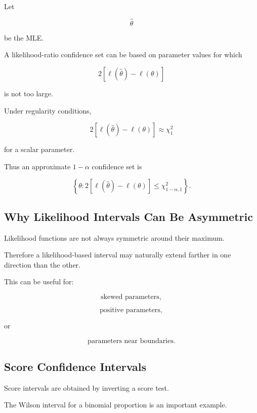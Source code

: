 Let

\[
\widehat{\theta}
\]

be the MLE.

A likelihood-ratio confidence set can be based on parameter values for
which

\[
\boxed{
2
\left[
\ell(\widehat{\theta})
-
\ell(\theta)
\right]
}
\]

is not too large.

Under regularity conditions,

\[
\boxed{
2
\left[
\ell(\widehat{\theta})
-
\ell(\theta)
\right]
\approx
\chi^2_1
}
\]

for a scalar parameter.

Thus an approximate \(1-\alpha\) confidence set is

\[
\boxed{
\left\{
\theta:
2
[
\ell(\widehat{\theta})
-
\ell(\theta)
]
\leq
\chi^2_{1-\alpha,1}
\right\}.
}
\]

\subsection{Why Likelihood Intervals Can Be Asymmetric}
\label{subsec:likelihood-ci-asymmetry}

Likelihood functions are not always symmetric around their maximum.

Therefore a likelihood-based interval may naturally extend farther in
one direction than the other.

This can be useful for:

\[
\boxed{
\text{skewed parameters},
}
\]

\[
\boxed{
\text{positive parameters},
}
\]

or

\[
\boxed{
\text{parameters near boundaries}.
}
\]

\subsection{Score Confidence Intervals}
\label{subsec:score-confidence-intervals}

Score intervals are obtained by inverting a score test.

The Wilson interval for a binomial proportion is an important example.


